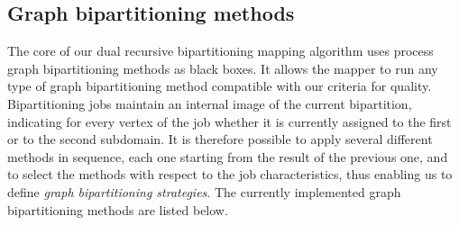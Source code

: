 \subsection{Graph bipartitioning methods}
\label{sec-algo-bipart}

The core of our dual recursive bipartitioning mapping algorithm uses
process graph bipartitioning methods as black boxes. It allows the
mapper to run any type of graph bipartitioning method compatible with
our criteria for quality.  Bipartitioning jobs maintain an internal
image of the current bipartition, indicating for every vertex of the
job whether it is currently assigned to the first or to the second
subdomain.
It is therefore possible to apply several different methods in sequence,
each one starting from the result of the previous one,
and to select the methods with respect to the job characteristics, thus
enabling us to define \emph{graph bipartitioning strategies}.
The currently implemented graph bipartitioning methods are listed below.
